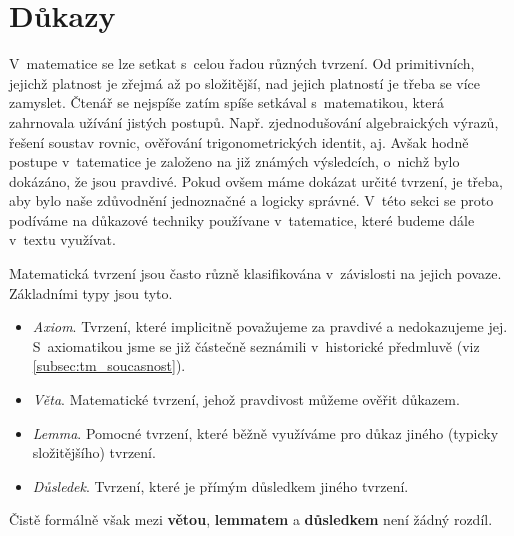 \chapter{Důkazy}\label{chap:dukazy}
V~matematice se lze setkat s~celou řadou různých tvrzení. Od primitivních, jejichž platnost je zřejmá až po složitější, nad jejich platností je třeba se více zamyslet. Čtenář se nejspíše zatím spíše setkával s~matematikou, která zahrnovala užívání jistých postupů. Např. zjednodušování algebraických výrazů, řešení soustav rovnic, ověřování trigonometrických identit, aj. Avšak hodně postupe v~tatematice je založeno na již známých výsledcích, o~nichž bylo dokázáno, že jsou pravdivé. Pokud ovšem máme dokázat určité tvrzení, je třeba, aby bylo naše zdůvodnění jednoznačné a logicky správné. V~této sekci se proto podíváme na důkazové techniky používane v~tatematice, které budeme dále v~textu využívat.\par
Matematická tvrzení jsou často různě klasifikována v~závislosti na jejich povaze. Základními typy jsou tyto. 
\begin{itemize}
    \item \emph{Axiom}. Tvrzení, které implicitně považujeme za pravdivé a nedokazujeme jej. S~axiomatikou jsme se již částečně seznámili v~historické předmluvě (viz \ref{subsec:tm_soucasnost}).
    \item \emph{Věta}. Matematické tvrzení, jehož pravdivost můžeme ověřit důkazem.
    \item \emph{Lemma}. Pomocné tvrzení, které běžně využíváme pro důkaz jiného (typicky složitějšího) tvrzení.
    \item \emph{Důsledek}. Tvrzení, které je přímým důsledkem jiného tvrzení.
\end{itemize}
Čistě formálně však mezi \textbf{větou}, \textbf{lemmatem} a \textbf{důsledkem} není žádný rozdíl.

